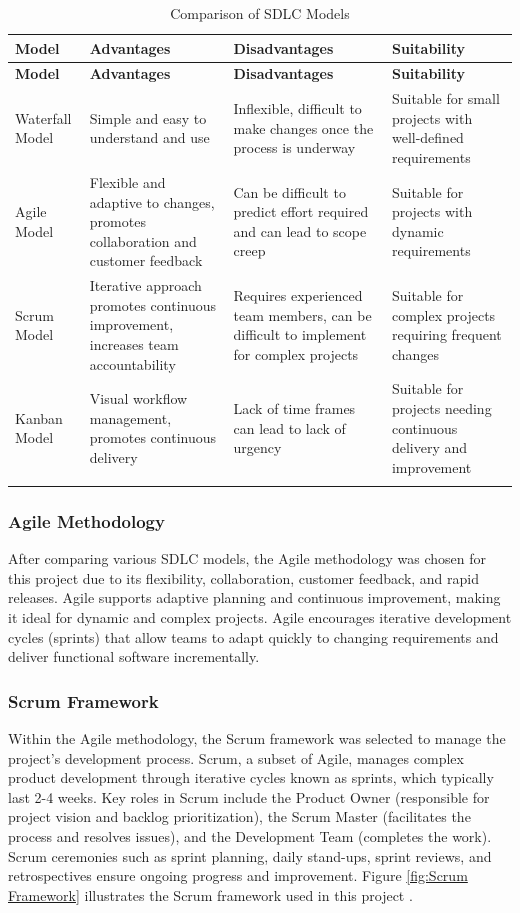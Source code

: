 \begin{longtable}{|m{3cm}|m{4cm}|m{4cm}|m{4cm}|}
\hline
\textbf{Model} & \textbf{Advantages} & \textbf{Disadvantages} & \textbf{Suitability} \\
\hline
\endfirsthead
\hline
\textbf{Model} & \textbf{Advantages} & \textbf{Disadvantages} & \textbf{Suitability} \\
\hline
\endhead
Waterfall Model & Simple and easy to understand and use & Inflexible, difficult to make changes once the process is underway & Suitable for small projects with well-defined requirements \\
\hline
Agile Model & Flexible and adaptive to changes, promotes collaboration and customer feedback & Can be difficult to predict effort required and can lead to scope creep & Suitable for projects with dynamic requirements \\
\hline
Scrum Model & Iterative approach promotes continuous improvement, increases team accountability & Requires experienced team members, can be difficult to implement for complex projects & Suitable for complex projects requiring frequent changes \\
\hline
Kanban Model & Visual workflow management, promotes continuous delivery & Lack of time frames can lead to lack of urgency & Suitable for projects needing continuous delivery and improvement \\
\hline
\caption{Comparison of SDLC Models}
\label{tab:sdlc_models}
\end{longtable}

\subsubsection{Agile Methodology}
After comparing various SDLC models, the Agile methodology was chosen for this project due to its flexibility, collaboration, customer feedback, and rapid releases. Agile supports adaptive planning and continuous improvement, making it ideal for dynamic and complex projects. Agile encourages iterative development cycles (sprints) that allow teams to adapt quickly to changing requirements and deliver functional software incrementally.

\subsubsection{Scrum Framework}
Within the Agile methodology, the Scrum framework was selected to manage the project's development process. Scrum, a subset of Agile, manages complex product development through iterative cycles known as sprints, which typically last 2-4 weeks. Key roles in Scrum include the Product Owner (responsible for project vision and backlog prioritization), the Scrum Master (facilitates the process and resolves issues), and the Development Team (completes the work). Scrum ceremonies such as sprint planning, daily stand-ups, sprint reviews, and retrospectives ensure ongoing progress and improvement. Figure \ref{fig:Scrum Framework} illustrates the Scrum framework used in this project \cite{scrumframework}.


